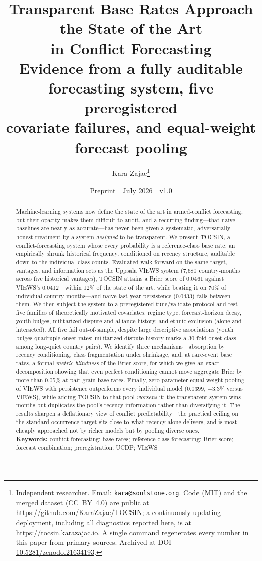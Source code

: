 \documentclass[11pt]{article}
\title{Transparent Base Rates Approach the State of the Art\\in Conflict Forecasting\\[6pt]
\large Evidence from a fully auditable forecasting system, five preregistered\\covariate failures, and equal-weight forecast pooling}
\author{Kara Zajac\thanks{Independent researcher. Email:
\texttt{kara@soulstone.org}. Code (MIT) and the merged dataset (CC~BY~4.0)
are public at \url{https://github.com/KaraZajac/TOCSIN}; a continuously
updating deployment, including all diagnostics reported here, is at
\url{https://tocsin.karazajac.io}. A single command regenerates every number
in this paper from primary sources. Archived at DOI
\href{https://doi.org/10.5281/zenodo.21634193}{10.5281/zenodo.21634193}.}}
\date{Preprint \,\textperiodcentered\, July 2026 \,\textperiodcentered\, v1.0}
\begin{document}
\maketitle

\begin{abstract}
\noindent Machine-learning systems now define the state of the art in
armed-conflict forecasting, but their opacity makes them difficult to audit,
and a recurring finding---that naive baselines are nearly as accurate---has
never been given a systematic, adversarially honest treatment by a system
\emph{designed} to be transparent. We present TOCSIN, a conflict-forecasting
system whose every probability is a reference-class base rate: an empirically
shrunk historical frequency, conditioned on recency structure, auditable down
to the individual class counts. Evaluated walk-forward on the same target,
vantages, and information sets as the Uppsala VIEWS system (7{,}680
country-months across five historical vantages), TOCSIN attains a Brier score
of 0.0461 against VIEWS's 0.0412---within 12\% of the state of the art, while
beating it on 70\% of individual country-months---and naive last-year
persistence (0.0433) falls between them. We then subject the system to a
preregistered tune/validate protocol and test five families of theoretically
motivated covariates: regime type, forecast-horizon decay, youth bulges,
militarized-dispute and alliance history, and ethnic exclusion (alone and
interacted). All five fail out-of-sample, despite large descriptive
associations (youth bulges quadruple onset rates; militarized-dispute history
marks a 30-fold onset class among long-quiet country pairs). We identify
three mechanisms---absorption by recency conditioning, class fragmentation
under shrinkage, and, at rare-event base rates, a formal \emph{metric
blindness} of the Brier score, for which we give an exact decomposition
showing that even perfect conditioning cannot move aggregate Brier by more
than 0.05\% at pair-grain base rates. Finally, zero-parameter equal-weight
pooling of VIEWS with persistence outperforms every individual model (0.0399,
$-3.3\%$ versus VIEWS), while adding TOCSIN to that pool \emph{worsens} it:
the transparent system wins months but duplicates the pool's recency
information rather than diversifying it. The results sharpen a deflationary
view of conflict predictability---the practical ceiling on the standard
occurrence target sits close to what recency alone delivers, and is most
cheaply approached not by richer models but by pooling diverse ones.\\[4pt]
\noindent\textbf{Keywords:} conflict forecasting; base rates;
reference-class forecasting; Brier score; forecast combination;
preregistration; UCDP; VIEWS
\end{abstract}
\end{document}
